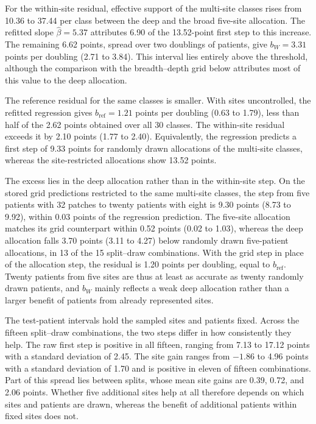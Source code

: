 \noindent For the within-site residual, effective support of the multi-site classes rises from 10.36 to 37.44 per class between the deep and the broad five-site allocation. The refitted slope $\hat\beta=5.37$ attributes 6.90 of the 13.52-point first step to this increase. The remaining 6.62 points, spread over two doublings of patients, give $b_W=3.31$ points per doubling (2.71 to 3.84). This interval lies entirely above the threshold, although the comparison with the breadth--depth grid below attributes most of this value to the deep allocation.

The reference residual for the same classes is smaller. With sites uncontrolled, the refitted regression gives $b_{\mathrm{ref}}=1.21$ points per doubling (0.63 to 1.79), less than half of the 2.62 points obtained over all 30 classes. The within-site residual exceeds it by 2.10 points (1.77 to 2.40). Equivalently, the regression predicts a first step of 9.33 points for randomly drawn allocations of the multi-site classes, whereas the site-restricted allocations show 13.52 points.

The excess lies in the deep allocation rather than in the within-site step. On the stored grid predictions restricted to the same multi-site classes, the step from five patients with 32 patches to twenty patients with eight is 9.30 points (8.73 to 9.92), within 0.03 points of the regression prediction. The five-site allocation matches its grid counterpart within 0.52 points (0.02 to 1.03), whereas the deep allocation falls 3.70 points (3.11 to 4.27) below randomly drawn five-patient allocations, in 13 of the 15 split--draw combinations. With the grid step in place of the allocation step, the residual is 1.20 points per doubling, equal to $b_{\mathrm{ref}}$. Twenty patients from five sites are thus at least as accurate as twenty randomly drawn patients, and $b_W$ mainly reflects a weak deep allocation rather than a larger benefit of patients from already represented sites.

The test-patient intervals hold the sampled sites and patients fixed. Across the fifteen split--draw combinations, the two steps differ in how consistently they help. The raw first step is positive in all fifteen, ranging from 7.13 to 17.12 points with a standard deviation of 2.45. The site gain ranges from $-1.86$ to 4.96 points with a standard deviation of 1.70 and is positive in eleven of fifteen combinations. Part of this spread lies between splits, whose mean site gains are 0.39, 0.72, and 2.06 points. Whether five additional sites help at all therefore depends on which sites and patients are drawn, whereas the benefit of additional patients within fixed sites does not.

